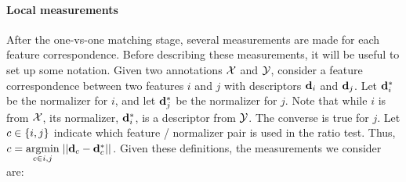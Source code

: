 \paragraph{Local measurements}
After the one-vs-one matching stage, several measurements are made for each feature correspondence.
Before describing these measurements, it will be useful to set up some notation.
Given two annotations $\mathcal{X}$ and $\mathcal{Y}$, consider a feature correspondence between two features $i$ and $j$
  with descriptors $\mathbf{d}_i$ and $\mathbf{d}_j$.
Let $\mathbf{d}^{*}_i$ be the normalizer for $i$, and let $\mathbf{d}^{*}_j$ be the normalizer for $j$.
Note that while $i$ is from $\mathcal{X}$, its normalizer, $\mathbf{d}^{*}_i$, is a descriptor from $\mathcal{Y}$.
The converse is true for $j$.
Let $c \in \left\{i, j\right\}$ indicate which feature / normalizer pair is used in the ratio test. %
Thus, $c = \underset{c \in {i, j}}{\operatorname{argmin}}\;{||\mathbf{d}_c - \mathbf{d}^{*}_c||_{}}$.
Given these definitions, the measurements we consider are:

